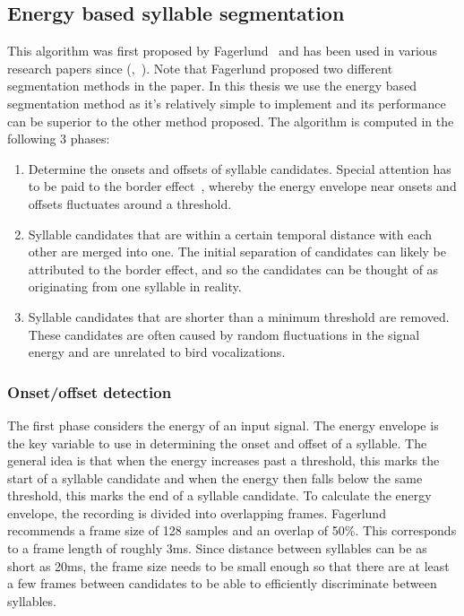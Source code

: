 \subsection{Energy based syllable segmentation}\label{ssec:syllable_seg}

This algorithm was first proposed by Fagerlund~\cite{fagerlund2004automatic}
and has been used in various research papers since
(\cite{somervuo2006parametric},~\cite{ramashini2022robust}). Note that Fagerlund
proposed two different segmentation methods in the paper. In this thesis we use
the energy based segmentation method as it's relatively
simple to implement and its performance can be superior to the other method
proposed. The algorithm is computed in the following 3 phases:

\begin{enumerate}

  \item Determine the onsets and offsets of syllable candidates. Special
    attention has to be paid to the border effect~\cite{li2001classification},
    whereby the energy envelope near onsets and offsets fluctuates around a
    threshold.

  \item Syllable candidates that are within a certain temporal distance with
    each other are merged into one. The initial separation of candidates can
    likely be attributed to the border effect, and so the candidates can be
    thought of as originating from one syllable in reality.

  \item Syllable candidates that are shorter than a minimum threshold are
    removed. These candidates are often caused by random fluctuations in the
    signal energy and are unrelated to bird vocalizations.

\end{enumerate}

\subsubsection{Onset/offset detection}

The first phase considers the energy of an input signal. The energy envelope is
the key variable to use in determining the onset and offset of a syllable. The
general idea is that when the energy increases past a threshold, this marks the
start of a syllable candidate and when the energy then falls below the same
threshold, this marks the end of a syllable candidate. To calculate the energy
envelope, the recording is divided into overlapping frames.
Fagerlund~\cite{fagerlund2004automatic} recommends a frame size of 128 samples
and an overlap of 50\%. This corresponds to a frame length of roughly 3ms. Since
distance between syllables can be as short as 20ms, the frame size needs to be
small enough so that there are at least a few frames between candidates to be
able to efficiently discriminate between syllables.

